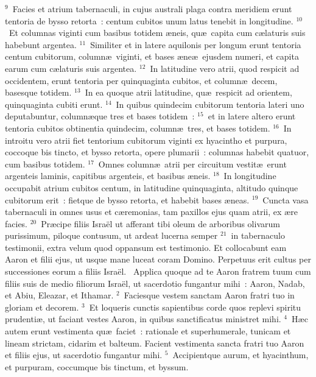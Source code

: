 ${}^{9}$~Facies et atrium tabernaculi, in cujus australi plaga contra meridiem erunt tentoria de bysso retorta~: centum cubitos unum latus tenebit in longitudine.
${}^{10}$~Et columnas viginti cum basibus totidem \ae neis, qu\ae\ capita cum c\ae laturis suis habebunt argentea.
${}^{11}$~Similiter et in latere aquilonis per longum erunt tentoria centum cubitorum, column\ae\ viginti, et bases \ae ne\ae\ ejusdem numeri, et capita earum cum c\ae laturis suis argentea.
${}^{12}$~In latitudine vero atrii, quod respicit ad occidentem, erunt tentoria per quinquaginta cubitos, et column\ae\ decem, basesque totidem.
${}^{13}$~In ea quoque atrii latitudine, qu\ae\ respicit ad orientem, quinquaginta cubiti erunt.
${}^{14}$~In quibus quindecim cubitorum tentoria lateri uno deputabuntur, column\ae que tres et bases totidem~:
${}^{15}$~et in latere altero erunt tentoria cubitos obtinentia quindecim, column\ae\ tres, et bases totidem.
${}^{16}$~In introitu vero atrii fiet tentorium cubitorum viginti ex hyacintho et purpura, coccoque bis tincto, et bysso retorta, opere plumarii~: columnas habebit quatuor, cum basibus totidem.
${}^{17}$~Omnes column\ae\ atrii per circuitum vestit\ae\ erunt argenteis laminis, capitibus argenteis, et basibus \ae neis.
${}^{18}$~In longitudine occupabit atrium cubitos centum, in latitudine quinquaginta, altitudo quinque cubitorum erit~: fietque de bysso retorta, et habebit bases \ae neas.
${}^{19}$~Cuncta vasa tabernaculi in omnes usus et c\ae remonias, tam paxillos ejus quam atrii, ex \ae re facies.
${}^{20}$~Pr\ae cipe filiis Isra\"el ut afferant tibi oleum de arboribus olivarum purissimum, piloque contusum, ut ardeat lucerna semper
${}^{21}$~in tabernaculo testimonii, extra velum quod oppansum est testimonio. Et collocabunt eam Aaron et filii ejus, ut usque mane luceat coram Domino. Perpetuus erit cultus per successiones eorum a filiis Isra\"el.
~\lettrine[lines=10,image=true,loversize=0.05,lraise=-0.03]{A}{}pplica quoque ad te Aaron fratrem tuum cum filiis suis de medio filiorum Isra\"el, ut sacerdotio fungantur mihi~: Aaron, Nadab, et Abiu, Eleazar, et Ithamar.
${}^{2}$~Faciesque vestem sanctam Aaron fratri tuo in gloriam et decorem.
${}^{3}$~Et loqueris cunctis sapientibus corde quos replevi spiritu prudenti\ae , ut faciant vestes Aaron, in quibus sanctificatus ministret mihi.
${}^{4}$~H\ae c autem erunt vestimenta qu\ae\ faciet~: rationale et superhumerale, tunicam et lineam strictam, cidarim et balteum. Facient vestimenta sancta fratri tuo Aaron et filiis ejus, ut sacerdotio fungantur mihi.
${}^{5}$~Accipientque aurum, et hyacinthum, et purpuram, coccumque bis tinctum, et byssum.


